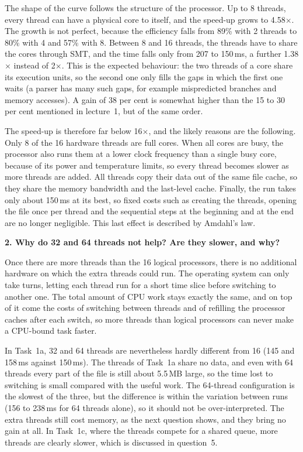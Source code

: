 \documentclass[11pt,a4paper]{article}
\newcommand{\timesx}{\ensuremath{\times}}
\newcommand{\question}[1]{\par\medskip\textbf{#1}\par}
\begin{document}
The shape of the curve follows the structure of the processor. Up to 8 threads, every thread can have
a physical core to itself, and the speed-up grows to 4.58\timesx. The growth is not perfect, because
the efficiency falls from 89\% with 2 threads to 80\% with 4 and 57\% with 8. Between 8 and 16
threads, the threads have to share the cores through SMT, and the time falls only from 207 to
150\,ms, a further 1.38\timesx{} instead of 2\timesx. This is the expected behaviour: the two threads of a
core share its execution units, so the second one only fills the gaps in which the first one waits
(a parser has many such gaps, for example mispredicted branches and memory accesses). A gain of 38
per cent is somewhat higher than the 15 to 30 per cent mentioned in lecture~1, but of the same order.

The speed-up is therefore far below 16\timesx, and the likely reasons are the following. Only 8 of the 16
hardware threads are full cores. When all cores are busy, the processor also runs them at a lower
clock frequency than a single busy core, because of its power and temperature limits, so every
thread becomes slower as more threads are added. All threads copy their data out of the same file
cache, so they share the memory bandwidth and the last-level cache. Finally, the run takes only about
150\,ms at its best, so fixed costs such as creating the threads, opening the file once per thread and
the sequential steps at the beginning and at the end are no longer negligible. This last effect is
described by Amdahl's law.

\question{2. Why do 32 and 64 threads not help? Are they slower, and why?}

Once there are more threads than the 16 logical processors, there is no additional hardware on which
the extra threads could run. The operating system can only take turns, letting each thread run for a
short time slice before switching to another one. The total amount of CPU work stays exactly the
same, and on top of it come the costs of switching between threads and of refilling the processor
caches after each switch, so more threads than logical processors can never make a CPU-bound task
faster.

In Task~1a, 32 and 64 threads are nevertheless hardly different from 16 (145 and 158\,ms against
150\,ms). The threads of Task~1a share no data, and even with 64 threads every part of the file is
still about 5.5\,MB large, so the time lost to switching is small compared with the useful work. The
64-thread configuration is the slowest of the three, but the difference is within the variation
between runs (156 to 238\,ms for 64 threads alone), so it should not be over-interpreted. The extra
threads still cost memory, as the next question shows, and they bring no gain at all. In Task~1c,
where the threads compete for a shared queue, more threads are clearly slower, which is discussed in
question~5.
\end{document}
